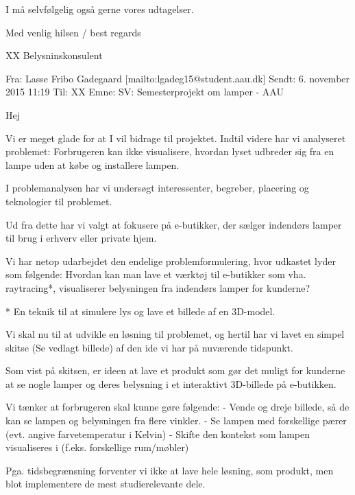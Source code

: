 \documentclass[oneside,a4paper,titlepage]{article}
\begin{document}
I må selvfølgelig også gerne vores udtagelser.  

Med venlig hilsen / best regards

XX\newline
Belysninskonsulent

\noindent\makebox[\linewidth]{\rule{\paperwidth}{0.4pt}}

Fra: Lasse Fribo Gadegaard [mailto:lgadeg15@student.aau.dk] \newline
Sendt: 6. november 2015 11:19\newline
Til: XX\newline
Emne: SV: Semesterprojekt om lamper - AAU

Hej 
 
Vi er meget glade for at I vil bidrage til projektet. Indtil videre har vi analyseret problemet: 
Forbrugeren kan ikke visualisere, hvordan lyset udbreder sig fra en lampe uden at købe og installere lampen. 

I problemanalysen har vi undersøgt interessenter, begreber, placering og teknologier til problemet. 

Ud fra dette har vi valgt at fokusere på e-butikker, der sælger indendørs lamper til brug i erhverv eller private hjem. 

Vi har netop udarbejdet den endelige problemformulering, hvor udkastet lyder som følgende:
Hvordan kan man lave et værktøj til e-butikker som vha. raytracing*, visualiserer belysningen fra indendørs lamper for kunderne? 

* En teknik til at simulere lys og lave et billede af en 3D-model. 

Vi skal nu til at udvikle en løsning til problemet, og hertil har vi lavet en simpel skitse (Se vedlagt billede) af den ide vi har på nuværende tidspunkt. 
 
Som vist på skitsen, er ideen at lave et produkt som gør det muligt for kunderne at se nogle lamper og deres belysning i et interaktivt 3D-billede på e-butikken. 

Vi tænker at forbrugeren skal kunne gøre følgende: \newline
 - Vende og dreje billede, så de kan se lampen og belysningen fra flere vinkler. \newline
 - Se lampen med forskellige pærer (evt. angive farvetemperatur i Kelvin) \newline
 - Skifte den kontekst som lampen visualiseres i (f.eks. forskellige rum/møbler)

Pga. tidsbegrænsning forventer vi ikke at lave hele løsning, som produkt, men blot implementere de mest studierelevante dele. 
\end{document}

